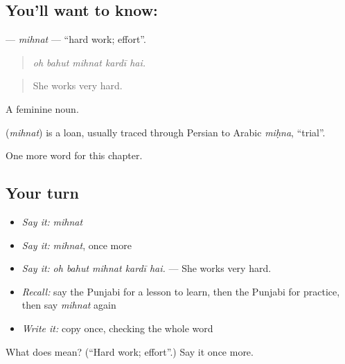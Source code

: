 \subsection*{You'll want to know: }
\textbf{} — \emph{mihnat} — \textquotedblleft{}hard work; effort\textquotedblright{}.

\begin{quote}
    
\end{quote}

\begin{quote}
\emph{oh bahut mihnat kardī hai.}
\end{quote}

\begin{quote}
She works very hard.
\end{quote}

A feminine noun.

\begin{cousinweb}
\textbf{} (\emph{mihnat}) is a loan, usually traced through Persian to Arabic \emph{miḥna}, \textquotedblleft{}trial\textquotedblright{}.
\end{cousinweb}

\begin{grammarlens}[title={What you've built}]
One more word for this chapter.
\end{grammarlens}

\subsection*{Your turn}
\begin{itemize}
\raggedright
  \item \emph{Say it:} \emph{mihnat}
  \item \emph{Say it:} \emph{mihnat}, once more
  \item \emph{Say it:} \emph{oh bahut mihnat kardī hai.} — She works very hard.
  \item \emph{Recall:} say the Punjabi for a lesson to learn, then the Punjabi for practice, then say \emph{mihnat} again
  \item \emph{Write it:} copy \textbf{} once, checking the whole word
\end{itemize}

\begin{tcolorbox}[breakable,colback=teal!4,colframe=teal!35!black,title={Before you move on}]
What does  mean? (\textquotedblleft{}Hard work; effort\textquotedblright{}.) Say it once more.
\end{tcolorbox}
